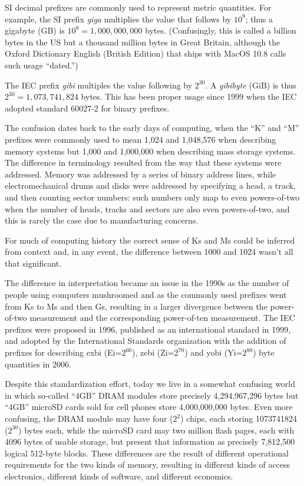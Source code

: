 SI decimal prefixes are commonly used to represent metric
quantities. For example, the SI prefix \emph{giga} multiplies the value that follows by
$10^9$; thus a gigabyte (GB) is
$10^9=1,000,000,000$ bytes. (Confusingly, this is called a billion bytes
in the US but a thousand million bytes in Great Britain, although the
Oxford Dictionary English (British Edition) that ships with MacOS 10.8
calls such usage ``dated.'')

The IEC prefix \emph{gibi} multiples the value following by $2^{30}$. A \emph{gibibyte}
(GiB) is thus $2^{30}=1,073,741,824$ bytes. This has been proper usage
since 1999 when the IEC adopted standard 60027-2 for binary prefixes.

The confusion dates back to the early days of computing, when the ``K''
and ``M'' prefixes were commonly used to mean 1,024 and 1,048,576
when describing memory systems but 1,000 and 1,000,000 when
describing mass storage systems. The difference in terminology resulted
from the way that these systems were addressed. Memory was addressed
by a series of binary address lines, while electromechanical drums and
disks were addressed by specifying a head, a track, and then counting
sector numbers: such numbers only map to even powers-of-two when the
number of heads, tracks and sectors are also even powers-of-two, and
this is rarely the case due to manufacturing concerns.

For much of computing history the correct sense of Ks and Ms could be
inferred from context and, in any event, the difference between 1000
and 1024 wasn't all that significant.

The difference in interpretation became an issue in the 1990s as the
number of people using computers mushroomed and as the commonly used
prefixes went from Ks to Ms and then Gs, resulting in a larger
divergence between the power-of-two measurement and the corresponding
power-of-ten measurement. The IEC prefixes were proposed in
1996\cite{iec:1996},
published as an international standard in 1999, and adopted by the
International Standards organization with the addition of prefixes for
describing exbi (Ei=$2^{60}$), zebi (Zi=$2^{70}$) and yobi (Yi=$2^{80}$) byte
quantities in 2006\cite{iec:80000-13:2008}.  

Despite this standardization effort, today we live in a somewhat
confusing world in which so-called ``4GB'' DRAM modules 
store precisely 4,294,967,296 bytes
but ``4GB'' microSD cards sold for cell
phones store 4,000,000,000 bytes. Even more confusing, the DRAM
module may have four ($2^{2}$) chips, each storing 1073741824
($2^{30}$) bytes each, while the microSD card may two million flash
pages, each with 4096 bytes of usable storage, but present that
information as precisely 7,812,500 logical 512-byte blocks.  These
differences are the result of different operational requirements for
the two kinds of memory, resulting in different kinds of access
electronics, different kinds of software, and different economics. 

